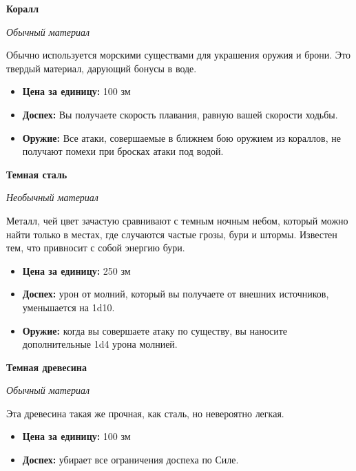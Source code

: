 \documentclass[a4paper, 9pt, twocolumn]{book}
\begin{document}
	\noindent \textbf{Коралл}
	
	\noindent \textit{Обычный материал}
	
	\smallskip
	
	\noindent Обычно используется морскими существами для украшения оружия и брони. Это твердый материал, дарующий бонусы в воде.
	
	\begin{itemize}
		\item \textbf{Цена за единицу:} 100 зм
		
		\item \textbf{Доспех:} Вы получаете скорость плавания, равную вашей скорости ходьбы.
		
		\item \textbf{Оружие:} Все атаки, совершаемые в ближнем бою оружием из кораллов, не получают помехи при бросках атаки под водой.
	\end{itemize}

	\noindent \textbf{Темная сталь}
	
	\noindent \textit{Необычный материал}
	
	\smallskip 
	
	\noindent Металл, чей цвет зачастую сравнивают с темным ночным небом, который можно найти только в местах, где случаются частые грозы, бури и штормы. Известен тем, что привносит с собой энергию бури.
	
	\begin{itemize}
		\item \textbf{Цена за единицу:} 250 зм
		
		\item \textbf{Доспех:} урон от молний, который вы получаете от внешних источников, уменьшается на 1d10.
		
		\item \textbf{Оружие:} когда вы совершаете атаку по существу, вы наносите дополнительные 1d4 урона молнией.
	\end{itemize}

	\noindent \textbf{Темная древесина}
	
	\noindent \textit{Обычный материал}
	
	\smallskip
	
	Эта древесина такая же прочная, как сталь, но невероятно легкая.
	
	\begin{itemize}
		\item \textbf{Цена за единицу:} 100 зм
		
		\item \textbf{Доспех:} убирает все ограничения доспеха по Силе.
	\end{itemize}
\end{document}
